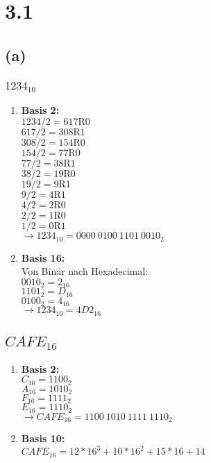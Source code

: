 \section*{3.1}
\subsection*{(a)}
\subsubsection*{$1234_{10}$}
\begin{enumerate}
	\item \textbf{Basis 2:}\\
	$1234 / 2 = 617 \text{R} 0$\\
	$617 / 2 = 308 \text{R} 1$\\
	$308 / 2 = 154 \text{R} 0$\\ 
	$154 / 2 = 77 \text{R} 0$\\
	$77 / 2 = 38 \text{R} 1$\\
	$38 / 2 = 19 \text{R} 0$\\
	$19 / 2 = 9 \text{R} 1$\\
	$9 / 2 = 4 \text{R} 1$\\
	$4 / 2 = 2 \text{R} 0$\\
	$2 / 2 = 1 \text{R} 0$\\
	$1 / 2 = 0 \text{R} 1$\\
	$\rightarrow 1234_{10} = 0000\ 0100\ 1101\ 0010_2$
	\item \textbf{Basis 16:}\\
	Von Binär nach Hexadecimal:\\
	$0010_2 = 2_{16}$\\
	$1101_2 = D_{16}$\\
	$0100_2 = 4_{16}$\\
	$\rightarrow 1234_{10} = 4D2_{16}$
\end{enumerate}
\subsection*{$CAFE_{16}$}
\begin{enumerate}
\item \textbf{Basis 2:}\\
$C_{16} = 1100_2$\\
$A_{16} = 1010_2$\\
$F_{16} = 1111_2$\\
$E_{16} = 1110_2$\\
$\rightarrow CAFE_{16} = 1100\ 1010\ 1111\ 1110_2$
\item \textbf{Basis 10:}\\
$CAFE_{16} = 12 * 16^3 + 10 * 16^2 + 15 * 16 + 14$
\end{enumerate}

